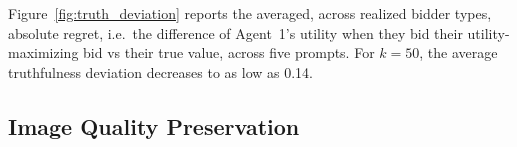 \documentclass[format=acmsmall, review=false]{acmart}
\begin{document}
Figure~\ref{fig:truth_deviation} reports the averaged, across realized bidder types, absolute regret, i.e.~the difference of Agent~1’s utility when they bid their utility-maximizing bid vs their true value, across five prompts. For $k=50$, the average truthfulness deviation decreases to as low as 0.14. 






\subsection{Image Quality Preservation}




\end{document}
